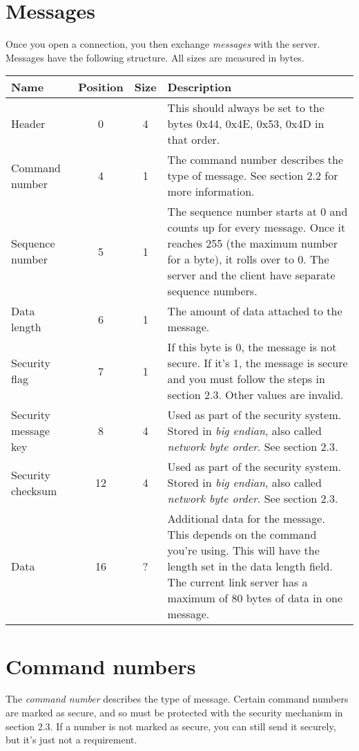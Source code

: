 \documentclass{report}
\begin{document}
\section{Messages}
Once you open a connection, you then exchange \emph{messages} with the server.
Messages have the following structure. All sizes are measured in bytes.
\begin{center}
\begin{tabular}{ l c c m{10 cm} }
	Name & Position & Size & Description \\
	\hline
	Header & 0 & 4 & This should always be set to the bytes 0x44, 0x4E, 0x53, 0x4D in that order. \\
	Command number & 4 & 1 & The command number describes the type of message. See section 2.2 for more information. \\
	Sequence number & 5 & 1 & The sequence number starts at 0 and counts up for every message. Once it reaches 255 (the maximum number for a byte), it rolls over to 0. The server and the client have separate sequence numbers. \\
	Data length & 6 & 1 & The amount of data attached to the message. \\
	Security flag & 7 & 1 & If this byte is 0, the message is not secure. If it's 1, the message is secure and you must follow the steps in section 2.3. Other values are invalid. \\
	Security message key & 8 & 4 & Used as part of the security system. Stored in \emph{big endian}, also called \emph{network byte order}. See section 2.3. \\
	Security checksum & 12 & 4 & Used as part of the security system. Stored in \emph{big endian}, also called \emph{network byte order}. See section 2.3. \\
	Data & 16 & ? & Additional data for the message. This depends on the command you're using. This will have the length set in the data length field. The current link server has a maximum of 80 bytes of data in one message.
\end{tabular}
\end{center}

\pagebreak
\section{Command numbers}
The \emph{command number} describes the type of message.
Certain command numbers are marked as secure, and so must be protected with the security mechanism in section 2.3.
If a number is not marked as secure, you can still send it securely, but it's just not a requirement.
\end{document}
